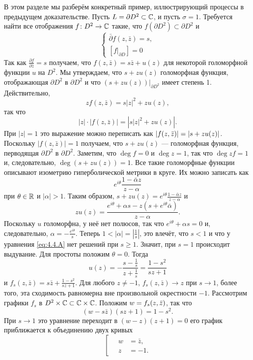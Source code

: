 В этом разделе мы разберём конкретный пример, иллюстрирующий процессы в предыдущем доказательстве.
Пусть $L = \partial D^2 \subset \mathbb{C}$, и пусть $\sigma = 1$.
Требуется найти все отображения $f\colon D^2 \to \mathbb{C}$ такие, что $f
(\partial D^2) \subset \partial D^2$ и 
\begin{equation}
\begin{cases}
\bar\partial f(z,\bar z)=s,
\\
[f|_{\partial D}]=0
\end{cases}
\label{eq:4.4.A}
\end{equation}
Так как $\tfrac{\partial f}{\partial \bar z} = s$ получаем, что $f (z,
\bar z) = s\bar z + u (z)$ для некоторой голоморфной функции $u$ на
$D^2$. 
Мы утверждаем, что $s+ zu (z)$ голоморфная функция, отображающая
$\partial D^2$ в $\partial D^2$ и что $(s+ zu (z))|_{\partial D^2}$
имеет степень 1. 
Действительно, 
\[zf (z,\bar z) = s | z |^2 + zu (z),\]
так что
\[|z|{\cdot}| f (z, \bar z) | = \left| s \left| z \right|^{2} + zu (z)\right|.\]
При $|z|=1$ это выражение можно переписать как
$|f(z,\bar z)|=|s\z+zu(z)|$.
Поскольку $|f(z,\bar z)|=1$ получаем, что $s+zu(z)$ — голоморфная функция, перводящая $\partial D^2$ в $\partial D^2$.
Заметим, что $\deg f = 0$ и $\deg z = 1$, так что $\deg zf= 1 $ и, следовательно, $\deg (s + zu (z)) = 1$.
Все такие голоморфные функции описывают изометрию гиперболической метрики в круге.
Их можно записать как
\[e^{i\theta}\frac{1 - \bar\alpha z}{z-\alpha}\]
при $\theta \in \mathbb{R}$ и $| \alpha | > 1$.
Таким образом, $s + zu (z) = e^{i\theta}\frac{1 - \bar\alpha z}{z-\alpha}$ и 
\[zu (z)
=
\frac{e^{i\theta} + \alpha s - z (s + e^{i\theta} \bar\alpha)}{z-\alpha}.\]
Поскольку $u$ голоморфна, у неё нет полюсов, так что $e^{i\theta} + \alpha s = 0$ и, следовательно, $\alpha =-\frac{e^{i\theta}}{s}$.
Теперь $1 <| \alpha | = | \tfrac1s |$, это влечёт, что $s<1$ и что у уравнения \ref{eq:4.4.A} нет решений при $s \ge 1$.
Значит, при $s = 1$ происходит выдувание.
Для простоты положим $\theta = 0$.
Тогда 
\[u(z)
=
-\frac{s-\frac1s}{z+\frac1s}
=
\frac{1-s^2}{sz+1}\]
и $f_s(z,\bar z)=s\bar z+\frac{1-s^2}{sz+1}$.
Для любого $z \ne -1$, $f_s (z, \bar z) \to z$ при $s\to1$, 
более того, эта сходимость равномерна вне произвольной окрестности $-1$.
Рассмотрим графики $f_s$ в $D^2 \times \mathbb{C} \subset \mathbb{C} \times
  \mathbb{C}$.
Положим $w \z= f_s (z, \bar z)$, так что 
\[(w - s\bar z) (sz + 1) = 1 - s^2.\]
При $s \to 1$ это уравнение переходит в $(w - z) (z + 1) = 0$ его график приближается к объединению двух кривых 
\[
\left[
\begin{aligned}
\quad w&=\bar z,
\\
\quad z&=-1.
\end{aligned}
\right.
\]

